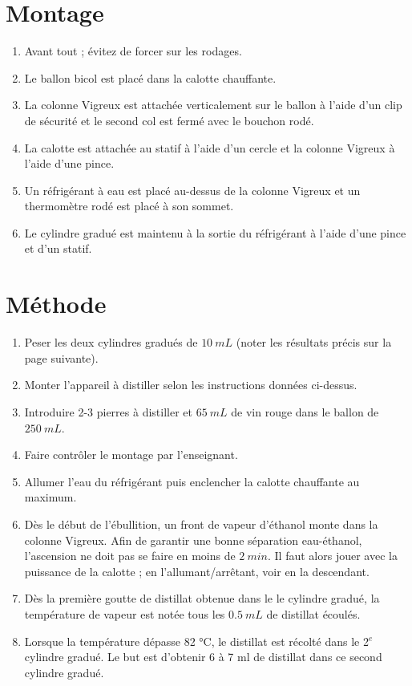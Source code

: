 \documentclass[11pt]{article}
\begin{document}
\section*{Montage}
\begin{enumerate}
\item Avant tout ; évitez de forcer sur les rodages.
\item Le ballon bicol est placé dans la calotte chauffante.
\item La  colonne  Vigreux  est  attachée  verticalement  sur  le  ballon  à  l'aide  d'un  clip  
de  sécurité  et  le second col est fermé avec le bouchon rodé.
\item La calotte est attachée au statif à l'aide d'un cercle et la colonne Vigreux à l'aide d'une 
pince.
\item Un réfrigérant à eau est placé au-dessus de la colonne Vigreux et un thermomètre rodé est 
placé à son sommet.
\item Le cylindre gradué est maintenu à la sortie du réfrigérant à l'aide d'une pince et d'un 
statif.
\end{enumerate}

\section*{Méthode}
\begin{enumerate}
\item Peser les deux cylindres gradués de $10 \: mL$ (noter les résultats précis sur la page suivante).
\item Monter l'appareil à distiller selon les instructions données ci-dessus.
\item Introduire 2-3 pierres à distiller et $65 \: mL$ de vin rouge dans le ballon de $250 \: mL$.
\item Faire contrôler le montage par l'enseignant.
\item Allumer l'eau du réfrigérant puis enclencher la calotte chauffante au maximum.
\item Dès le début de l'ébullition,  un front de vapeur d’éthanol monte dans la colonne Vigreux. 
Afin de
garantir  une bonne séparation  eau-éthanol,  l'ascension  ne doit pas se faire en moins de $2 \: min$. 
Il faut alors jouer avec la puissance de la calotte ; en l’allumant/arrêtant, voir en la 
descendant.
\item Dès la première  goutte de distillat  obtenue  dans le  le cylindre gradué,  la température  
de vapeur est notée tous les $0.5 \: mL$ de distillat écoulés.
\item Lorsque  la température  dépasse  82 °C,  le distillat  est récolté  dans le 2$^e$ cylindre  
gradué.  Le but est d'obtenir 6 à 7 ml de distillat dans ce second cylindre gradué.
\end{enumerate}
\clearpage
\end{document}
